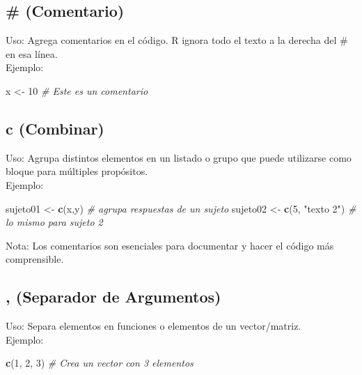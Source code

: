\documentclass[
]{book}
\newenvironment{Shaded}{\begin{snugshade}}{\end{snugshade}}
\newcommand{\CommentTok}[1]{\textcolor[rgb]{0.56,0.35,0.01}{\textit{#1}}}
\newcommand{\DecValTok}[1]{\textcolor[rgb]{0.00,0.00,0.81}{#1}}
\newcommand{\FunctionTok}[1]{\textcolor[rgb]{0.13,0.29,0.53}{\textbf{#1}}}
\newcommand{\NormalTok}[1]{#1}
\newcommand{\OtherTok}[1]{\textcolor[rgb]{0.56,0.35,0.01}{#1}}
\newcommand{\StringTok}[1]{\textcolor[rgb]{0.31,0.60,0.02}{#1}}
\begin{document}
\subsection{\# (Comentario)}\label{comentario}

Uso: Agrega comentarios en el código. R ignora todo el texto a la derecha del \# en esa línea.\\
Ejemplo:

\begin{Shaded}
\begin{Highlighting}[]
\NormalTok{x }\OtherTok{\textless{}{-}} \DecValTok{10}  \CommentTok{\# Este es un comentario}
\end{Highlighting}
\end{Shaded}

\subsection{c (Combinar)}\label{combinar}

Uso: Agrupa distintos elementos en un listado o grupo que puede utilizarse como bloque para múltiples propósitos.\\
Ejemplo:

\begin{Shaded}
\begin{Highlighting}[]
\NormalTok{sujeto01 }\OtherTok{\textless{}{-}} \FunctionTok{c}\NormalTok{(x,y)  }\CommentTok{\# agrupa respuestas de un sujeto}
\NormalTok{sujeto02 }\OtherTok{\textless{}{-}} \FunctionTok{c}\NormalTok{(}\DecValTok{5}\NormalTok{, }\StringTok{"texto 2"}\NormalTok{) }\CommentTok{\# lo mismo para sujeto 2}
\end{Highlighting}
\end{Shaded}

Nota: Los comentarios son esenciales para documentar y hacer el código más comprensible.

\subsection{, (Separador de Argumentos)}\label{separador}

Uso: Separa elementos en funciones o elementos de un vector/matriz.\\
Ejemplo:

\begin{Shaded}
\begin{Highlighting}[]
\FunctionTok{c}\NormalTok{(}\DecValTok{1}\NormalTok{, }\DecValTok{2}\NormalTok{, }\DecValTok{3}\NormalTok{)  }\CommentTok{\# Crea un vector con 3 elementos}
\end{Highlighting}
\end{Shaded}
\end{document}
